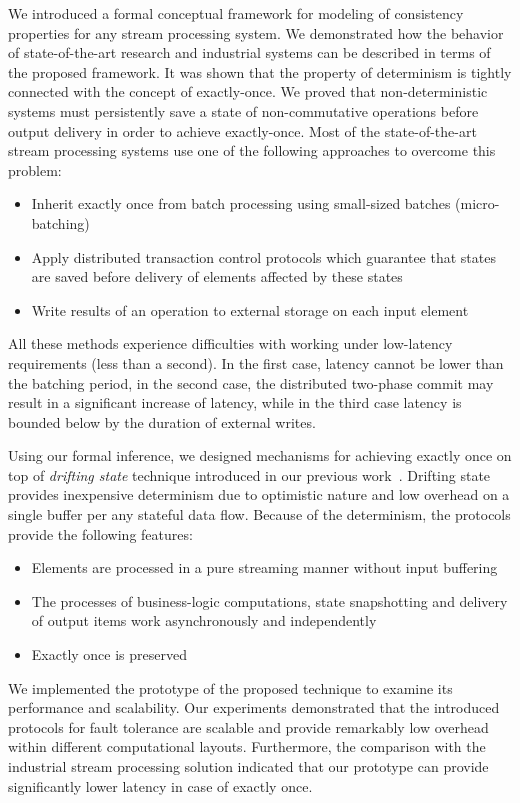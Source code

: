
\label {fs-conclusion-seciton}

We introduced a formal conceptual framework for modeling of consistency properties for any stream processing system. We demonstrated how the behavior of state-of-the-art research and industrial systems can be described in terms of the proposed framework. It was shown that the property of determinism is tightly connected with the concept of exactly-once. We proved that non-deterministic systems must persistently save a state of non-commutative operations before output delivery in order to achieve exactly-once. Most of the state-of-the-art stream processing systems use one of the following approaches to overcome this problem: 

\begin{itemize}
    \item Inherit exactly once from batch processing using small-sized batches (micro-batching)
    \item Apply distributed transaction control protocols which guarantee that states are saved before delivery of elements affected by these states
    \item Write results of an operation to external storage on each input element
\end{itemize}

All these methods experience difficulties with working under low-latency requirements (less than a second). In the first case, latency cannot be lower than the batching period, in the second case, the distributed two-phase commit may result in a significant increase of latency, while in the third case latency is bounded below by the duration of external writes.

Using our formal inference, we designed mechanisms for achieving exactly once on top of {\em drifting state} technique introduced in our previous work~\cite{we2018adbis}. Drifting state provides inexpensive determinism due to optimistic nature and low overhead on a single buffer per any stateful data flow. Because of the determinism, the protocols provide the following features:

\begin{itemize}
    \item Elements are processed in a pure streaming manner without input buffering
    \item The processes of business-logic computations, state snapshotting and delivery of output items work asynchronously and independently
    \item Exactly once is preserved
\end{itemize}

We implemented the prototype of the proposed technique to examine its performance and scalability. Our experiments demonstrated that the introduced protocols for fault tolerance are scalable and provide remarkably low overhead within different computational layouts. Furthermore, the comparison with the industrial stream processing solution indicated that our prototype can provide significantly lower latency in case of exactly once.